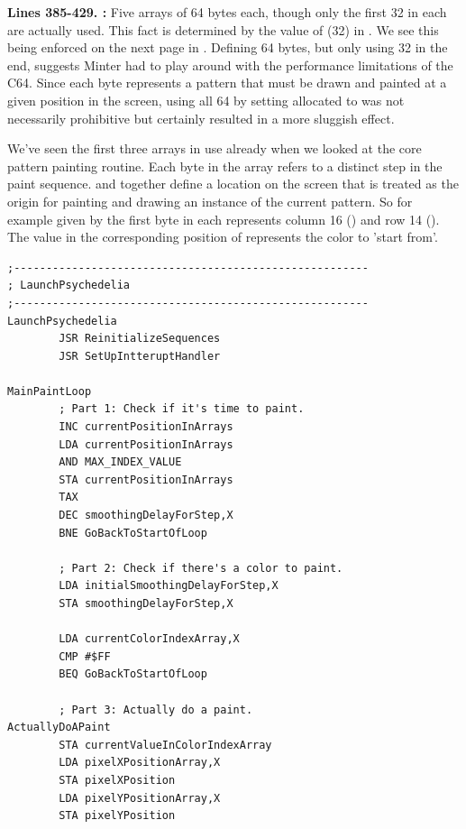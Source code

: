 {\begin{lstlisting}[caption = The pixel buffers\, each 64 bytes long though only 32 bytes are used in this version thanks to \icode{MAX\_INDEX\_VALUE}
being set to \icode{\$1F} (32).]
\end{lstlisting}
\clearpage

\textbf{Lines 385-429. :} Five arrays of 64 bytes each, though only the first 32 in each are actually used. This fact is determined
by the value of  (32) in . We see this being enforced on the next page in
. Defining 64 bytes, but only using 32 in the end, suggests Minter had to play around
with the performance limitations of the C64. Since each byte represents a pattern that must be drawn and painted
at a given position in the screen, using all 64 by setting allocated  to  
was not necessarily prohibitive but certainly resulted in a more sluggish effect.

We've seen the first three arrays in use already when we looked at the core
pattern painting routine. Each byte in the array refers to a distinct step in the paint sequence.
 and  together define a location on the screen
that is treated as the origin for painting and drawing an instance of the current pattern. So for example  given by the
first byte in each represents column 16 () and row 14 (). The value in
the corresponding position of  represents the color to 'start from'.


\clearpage
\begin{lstlisting}[caption= The game's main loop.]
;-------------------------------------------------------
; LaunchPsychedelia
;-------------------------------------------------------
LaunchPsychedelia   
        JSR ReinitializeSequences
        JSR SetUpIntteruptHandler

MainPaintLoop   
        ; Part 1: Check if it's time to paint.
        INC currentPositionInArrays
        LDA currentPositionInArrays
        AND MAX_INDEX_VALUE
        STA currentPositionInArrays
        TAX 
        DEC smoothingDelayForStep,X
        BNE GoBackToStartOfLoop

        ; Part 2: Check if there's a color to paint.
        LDA initialSmoothingDelayForStep,X
        STA smoothingDelayForStep,X

        LDA currentColorIndexArray,X
        CMP #$FF
        BEQ GoBackToStartOfLoop

        ; Part 3: Actually do a paint.
ActuallyDoAPaint
        STA currentValueInColorIndexArray
        LDA pixelXPositionArray,X
        STA pixelXPosition
        LDA pixelYPositionArray,X
        STA pixelYPosition


\end{lstlisting}}
